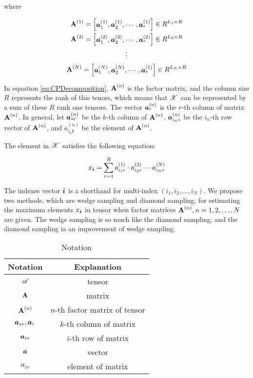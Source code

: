 \documentclass{article}
\newcommand{\Sca}[3]{{#1}^{(#2)}_{i_#2#3}}%
\newcommand{\T}[1]{\boldsymbol{\mathscr{\MakeUppercase{#1}}}}%
\newcommand{\V}[1]{{\bm{{\MakeLowercase{#1}}}}}%
\newcommand{\VnC}[3]{\V{#1}^{(#2)}_{#3}}%
\newcommand{\Varow}[1]{\V{a}^{(#1)}_{i_#1*}}
\newcommand{\Vacol}[1]{\V{a}^{(#1)}_{*r}}
\newcommand{\M}[1]{{\bm{\mathbf{\MakeUppercase{#1}}}}}%
\newcommand{\Mn}[2]{\M{#1}^{(#2)}}%
\begin{document}
where

\begin{gather*}\label{eq:ColumnVectorsForm}
\M{A}^{(1)} =
\begin{bmatrix}\VnC{a}{1}{1},\VnC{a}{1}{2},\cdots,\VnC{a}{1}{r}\end{bmatrix}\in R^{L_1\times R}\\
\M{A}^{(2)} =
\begin{bmatrix}\VnC{a}{2}{1},\VnC{a}{2}{2},\cdots,\VnC{a}{2}{r}\end{bmatrix}\in R^{L_2\times R}\\
\vdots\\
\M{A}^{(N)} =
\begin{bmatrix}\VnC{a}{N}{1},\VnC{a}{N}{2},\cdots,\VnC{a}{1}{r}\end{bmatrix}\in R^{L_N\times R}\\
\end{gather*}

In equation \ref{eq:CPDecomposition}, $\M{A}^{(n)}$ is the factor matrix, and the column size $R$ represents the rank of this tenors, which means that $\T{X}$ can be represented by a sum of these $R$ rank one tensors. The vector $\VnC{a}{n}{r}$ is the $r$-th column of matrix $\Mn{A}{n}$.
In general, let $\Vacol{n}$ be the $k$-th column of $\M{A}^{(n)}$, $\Varow{n}$ be the $i_n$-th row vector of $\M{A}^{(n)}$, and $\Sca{a}{n}{k}$ be the element of $\M{A}^{(n)}$.

The element in $\T{X}$ satisfies the following equation:

\begin{equation}\label{eq:ValueInTensor}
x_\V{i} = \sum_{r=1}^{R}\Sca{a}{1}{r}\cdot\Sca{a}{2}{r}\cdots\Sca{a}{N}{r}
\end{equation}

The indexes vector $\V{i}$ is a shorthand for multi-index $(i_1,i_2,\ldots,i_N)$. We propose two methods, which are wedge sampling and diamond sampling, for
estimating the maximum elements $x_\V{i}$ in tensor when factor matrices $\Mn{A}{n}, n = 1,2,\ldots,N$ are given. The wedge sampling is so much like the diamond sampling, and the diamond sampling ia an improvement of wedge sampling.

\begin{table}
  \centering
  \begin{tabular}{|c|c|}
    \hline
    Notation & Explanation \\
    \hline
    $\T{A}$ & tensor \\
    $\M{A}$ & matrix \\
    $\Mn{A}{n}$ & $n$-th factor matrix of tensor\\
    $\V{A}_{*r},\V{A}_r$ & $k$-th column of matrix \\
    $\V{A}_{i*}$ & $i$-th row of matrix \\
    $\V{A}$ & vector \\
    $a_{ir}$ & element of matrix\\
    \hline
  \end{tabular}
  \caption{Notation}\label{table:Notation}
\end{table}
\end{document}
